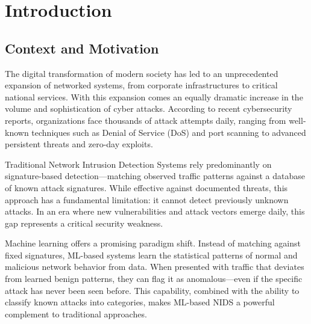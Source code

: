 \documentclass[12pt,a4paper,twoside]{report}
\begin{document}
\tableofcontents
\newpage

\listoffigures
{}
\newpage

\listoftables
{}
\newpage

\chapter{Introduction}

\section{Context and Motivation}

The digital transformation of modern society has led to an unprecedented expansion of networked systems, from corporate infrastructures to critical national services. With this expansion comes an equally dramatic increase in the volume and sophistication of cyber attacks. According to recent cybersecurity reports, organizations face thousands of attack attempts daily, ranging from well-known techniques such as Denial of Service (DoS) and port scanning to advanced persistent threats and zero-day exploits.

Traditional Network Intrusion Detection Systems rely predominantly on signature-based detection—matching observed traffic patterns against a database of known attack signatures. While effective against documented threats, this approach has a fundamental limitation: it cannot detect previously unknown attacks. In an era where new vulnerabilities and attack vectors emerge daily, this gap represents a critical security weakness.

Machine learning offers a promising paradigm shift. Instead of matching against fixed signatures, ML-based systems learn the statistical patterns of normal and malicious network behavior from data. When presented with traffic that deviates from learned benign patterns, they can flag it as anomalous—even if the specific attack has never been seen before. This capability, combined with the ability to classify known attacks into categories, makes ML-based NIDS a powerful complement to traditional approaches.
\end{document}
